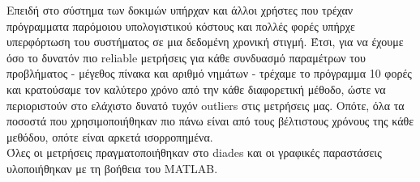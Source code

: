 \documentclass[11pt,a4paper,titlepage]{article}
\begin{document}
		Επειδή στο σύστημα των δοκιμών υπήρχαν και άλλοι χρήστες που τρέχαν πρόγραμματα παρόμοιου υπολογιστικού κόστους και πολλές φορές υπήρχε υπερφόρτωση του συστήματος σε μια δεδομένη χρονική στιγμή. Έτσι, για να έχουμε όσο το δυνατόν πιο reliable μετρήσεις για κάθε συνδυασμό παραμέτρων του προβλήματος - μέγεθος πίνακα και αριθμό νημάτων - τρέχαμε το πρόγραμμα 10 φορές και κρατούσαμε τον καλύτερο χρόνο από την κάθε διαφορετική μέθοδο, ώστε να περιοριστούν στο ελάχιστο δυνατό τυχόν outliers στις μετρήσεις μας. Οπότε, όλα τα ποσοστά που χρησιμοποιήθηκαν πιο πάνω είναι από τους βέλτιστους χρόνους της κάθε μεθόδου, οπότε είναι αρκετά ισορροπημένα.\\
		
		Όλες οι μετρήσεις πραγματοποιήθηκαν στο diades και οι γραφικές παραστάσεις υλοποιήθηκαν με τη βοήθεια του MATLAB.
\end{document}
